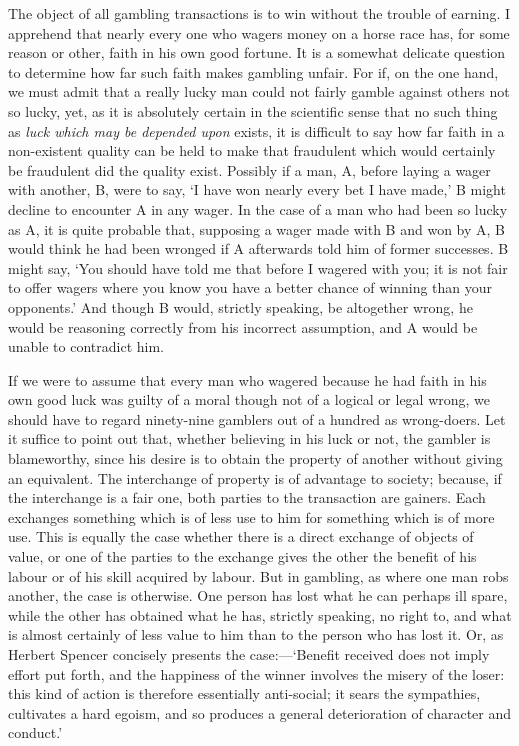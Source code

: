 \documentclass[letterpaper,12pt,oneside,openany]{memoir}
\begin{document}
The object of all gambling transactions is to win
without the trouble of earning. I apprehend that nearly
every one who wagers money on a horse race has, for
some reason or other, faith in his own good fortune.
It is a somewhat delicate question to determine how far
such faith makes gambling unfair. For if, on the one
hand, we must admit that a really lucky man could not
fairly gamble against others not so lucky, yet, as it is
absolutely certain in the scientific sense that no such
thing as \emph{luck which may be depended upon} exists, it is
difficult to say how far faith in a non-existent quality
can be held to make that fraudulent which would certainly
be fraudulent did the quality exist. Possibly if a
man, A, before laying a wager with another, B, were to
say, `I have won nearly every bet I have made,' B might
decline to encounter A in any wager. In the case of a
man who had been so lucky as A, it is quite probable
that, supposing a wager made with B and won by A, B
would think he had been wronged if A afterwards told
him of former successes. B might say, `You should
have told me that before I wagered with you; it is not
fair to offer wagers where you know you have a better
chance of winning than your opponents.' And though
B would, strictly speaking, be altogether wrong, he
would be reasoning correctly from his incorrect assumption,
and A would be unable to contradict him.

If we were to assume that every man who wagered
because he had faith in his own good luck was guilty of
a moral though not of a logical or legal wrong, we
should have to regard ninety-nine gamblers out of a
hundred as wrong-doers. Let it suffice to point out that,
whether believing in his luck or not, the gambler is
blameworthy, since his desire is to obtain the property
of another without giving an equivalent. The interchange
of property is of advantage to society; because,
if the interchange is a fair one, both parties to the transaction
are gainers. Each exchanges something which
is of less use to him for something which is of more use.
This is equally the case whether there is a direct exchange
of objects of value, or one of the parties to the
exchange gives the other the benefit of his labour or of
his skill acquired by labour. But in gambling, as
where one man robs another, the case is otherwise.
One person has lost what he can perhaps ill spare, while
the other has obtained what he has, strictly speaking,
no right to, and what is almost certainly of less value
to him than to the person who has lost it. Or, as
Herbert Spencer concisely presents the case:---`Benefit
received does not imply effort put forth, and the happiness
of the winner involves the misery of the loser: this
kind of action is therefore essentially anti-social; it sears
the sympathies, cultivates a hard egoism, and so produces
a general deterioration of character and conduct.'
\end{document}
